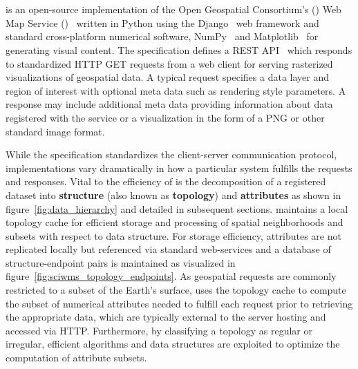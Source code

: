 \section{\sciwms{}}
\label{sec:sciwms}
\Sciwms{} is an open-source implementation of the Open Geospatial
Consortium's (\ogc{}) Web Map Service (\wms{})~\cite{wms14} written in
Python using the Django~\cite{django} web framework and standard
cross-platform numerical software, NumPy~\cite{numpy11} and
Matplotlib~\cite{hunter07} for generating visual content. The \wms{}
specification defines a REST API~\cite{Fielding02} which responds to
standardized HTTP GET requests from a web client for serving
rasterized visualizations of geospatial data. A typical \wms{} request
specifies a data layer and region of interest with optional meta data
such as rendering style parameters. A \wms{} response may include
additional meta data providing information about data registered with
the service or a visualization in the form of a PNG or other standard
image format.

While the \ogc{} \wms{} specification standardizes the client-server
communication protocol, \wms{} implementations vary dramatically in
how a particular system fulfills the \wms{} requests and
responses. Vital to the efficiency of \sciwms{} is the decomposition
of a registered dataset into \textbf{structure} (also known as
\textbf{topology}) and \textbf{attributes} as shown in
figure~\ref{fig:data_hierarchy} and detailed in subsequent
sections. \Sciwms{} maintains a local topology cache for efficient
storage and processing of spatial neighborhoods and subsets with
respect to data structure. For storage efficiency, attributes are not
replicated locally but referenced via standard web-services and a
database of structure-endpoint pairs is maintained as visualized in
figure~\ref{fig:sciwms_topology_endpoints}. As geospatial \wms{}
requests are commonly restricted to a subset of the Earth's surface,
\sciwms{} uses the topology cache to compute the subset of numerical
attributes needed to fulfill each request prior to retrieving the
appropriate data, which are typically external to the server hosting
\sciwms{} and accessed via HTTP. Furthermore, by classifying a
topology as regular or irregular, efficient algorithms and data
structures are exploited to optimize the computation of attribute
subsets.

